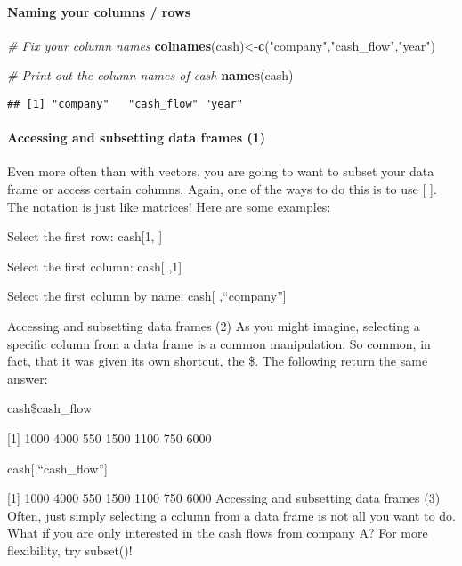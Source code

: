 \documentclass[]{article}
\newenvironment{Shaded}{\begin{snugshade}}{\end{snugshade}}
\newcommand{\KeywordTok}[1]{\textcolor[rgb]{0.13,0.29,0.53}{\textbf{#1}}}
\newcommand{\StringTok}[1]{\textcolor[rgb]{0.31,0.60,0.02}{#1}}
\newcommand{\CommentTok}[1]{\textcolor[rgb]{0.56,0.35,0.01}{\textit{#1}}}
\newcommand{\NormalTok}[1]{#1}
\let\oldparagraph\paragraph
\renewcommand{\paragraph}[1]{\oldparagraph{#1}\mbox{}}
\begin{document}
\paragraph{Naming your columns / rows}\label{naming-your-columns-rows}

\begin{Shaded}
\begin{Highlighting}[]
\CommentTok{# Fix your column names}
\KeywordTok{colnames}\NormalTok{(cash)<-}\KeywordTok{c}\NormalTok{(}\StringTok{"company"}\NormalTok{,}\StringTok{"cash_flow"}\NormalTok{,}\StringTok{"year"}\NormalTok{)}

\CommentTok{# Print out the column names of cash}
\KeywordTok{names}\NormalTok{(cash)}
\end{Highlighting}
\end{Shaded}

\begin{verbatim}
## [1] "company"   "cash_flow" "year"
\end{verbatim}

\paragraph{Accessing and subsetting data frames
(1)}\label{accessing-and-subsetting-data-frames-1}

Even more often than with vectors, you are going to want to subset your
data frame or access certain columns. Again, one of the ways to do this
is to use {[} {]}. The notation is just like matrices! Here are some
examples:

Select the first row: cash{[}1, {]}

Select the first column: cash{[} ,1{]}

Select the first column by name: cash{[} ,``company''{]}

Accessing and subsetting data frames (2) As you might imagine, selecting
a specific column from a data frame is a common manipulation. So common,
in fact, that it was given its own shortcut, the \$. The following
return the same answer:

cash\$cash\_flow

{[}1{]} 1000 4000 550 1500 1100 750 6000

cash{[},``cash\_flow''{]}

{[}1{]} 1000 4000 550 1500 1100 750 6000 Accessing and subsetting data
frames (3) Often, just simply selecting a column from a data frame is
not all you want to do. What if you are only interested in the cash
flows from company A? For more flexibility, try subset()!
\end{document}
